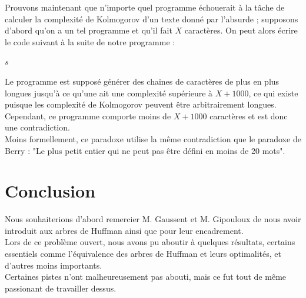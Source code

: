 \documentclass[a4paper, 12pt]{article}
\begin{document}
Prouvons maintenant que n'importe quel programme échouerait à la tâche de calculer la complexité de Kolmogorov d'un texte donné par l'absurde ; supposons d'abord qu'on a un tel programme et qu'il fait $X$ caractères. On peut alors écrire le code suivant à la suite de notre programme : \\

\begin{algorithm}
\begin{algorithmic}[1]
\State \Return $s$
\EndIf
\EndFor
\EndFor
\EndFunction
\end{algorithmic}
\end{algorithm}
\newpage
Le programme est supposé générer des chaines de caractères de plus en plus longues jusqu'à ce qu'une ait une complexité supérieure à $X+1000$, ce qui existe puisque les complexité de Kolmogorov peuvent être arbitrairement longues. Cependant, ce programme comporte moins de $X+1000$ caractères et est donc une contradiction. \\
Moins formellement, ce paradoxe utilise la même contradiction que le paradoxe de Berry : "Le plus petit entier qui ne peut pas être défini en moins de 20 mots".



\newpage

\section{Conclusion}

Nous souhaiterions d'abord remercier M. Gaussent et M. Gipouloux de nous avoir introduit aux arbres de Huffman ainsi que pour leur encadrement. \\

Lors de ce problème ouvert, nous avons pu aboutir à quelques résultats, certains essentiels comme l'équivalence des arbres de Huffman et leurs optimalités, et d'autres moins importants. \\
Certaines pistes n'ont malheureusement pas abouti, mais ce fut tout de même passionant de travailler dessus. \\
\end{document}
